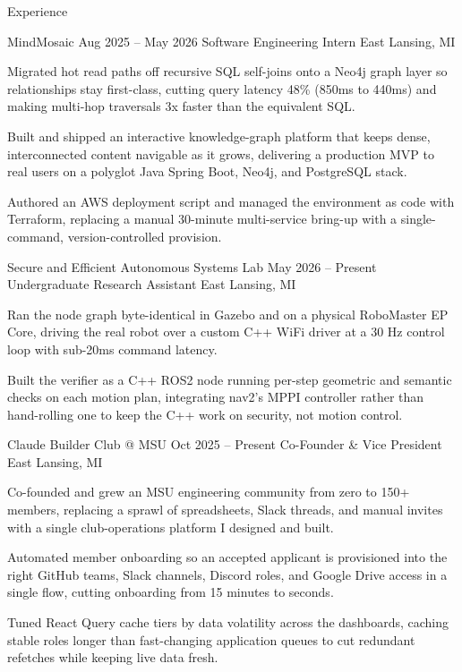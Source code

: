 \documentclass[
	11pt
]{../../../template}
\begin{document}
	\begin{rSection}{E}{xperience}
		\begin{rSectionEntry}
			{MindMosaic}
			{Aug 2025 -- May 2026}
			{Software Engineering Intern}
			{}
			{East Lansing, MI}

			\item Migrated hot read paths off recursive SQL self-joins onto a Neo4j graph layer so relationships stay first-class, cutting query latency 48\% (850ms to 440ms) and making multi-hop traversals 3x faster than the equivalent SQL.
			\item Built and shipped an interactive knowledge-graph platform that keeps dense, interconnected content navigable as it grows, delivering a production MVP to real users on a polyglot Java Spring Boot, Neo4j, and PostgreSQL stack.
			\item Authored an AWS deployment script and managed the environment as code with Terraform, replacing a manual 30-minute multi-service bring-up with a single-command, version-controlled provision.
		\end{rSectionEntry}

		\begin{rSectionEntry}
			{Secure and Efficient Autonomous Systems Lab}
			{May 2026 -- Present}
			{Undergraduate Research Assistant}
			{}
			{East Lansing, MI}

			\item Ran the node graph byte-identical in Gazebo and on a physical RoboMaster EP Core, driving the real robot over a custom C++ WiFi driver at a 30 Hz control loop with sub-20ms command latency.
			\item Built the verifier as a C++ ROS2 node running per-step geometric and semantic checks on each motion plan, integrating nav2's MPPI controller rather than hand-rolling one to keep the C++ work on security, not motion control.
		\end{rSectionEntry}

		\begin{rSectionEntry}
			{Claude Builder Club @ MSU}
			{Oct 2025 -- Present}
			{Co-Founder \& Vice President}
			{}
			{East Lansing, MI}

			\item Co-founded and grew an MSU engineering community from zero to 150+ members, replacing a sprawl of spreadsheets, Slack threads, and manual invites with a single club-operations platform I designed and built.
			\item Automated member onboarding so an accepted applicant is provisioned into the right GitHub teams, Slack channels, Discord roles, and Google Drive access in a single flow, cutting onboarding from 15 minutes to seconds.
			\item Tuned React Query cache tiers by data volatility across the dashboards, caching stable roles longer than fast-changing application queues to cut redundant refetches while keeping live data fresh.
		\end{rSectionEntry}
	\end{rSection}
\end{document}
